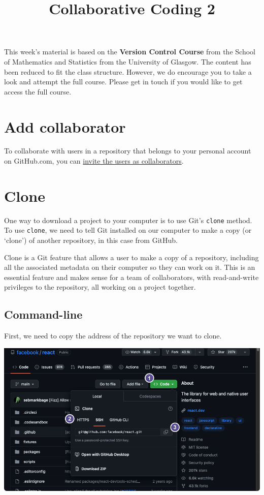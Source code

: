 \documentclass[
  letterpaper,
  DIV=11,
  numbers=noendperiod]{scrartcl}
\title{Collaborative Coding 2}
\author{}
\date{}
\makeatletter
\renewcommand{\maketitle}{\bgroup\setlength{\parindent}{0pt}
\begin{flushleft}
  {\color{uniblue}\sffamily\huge\textbf{\@title}} \vspace{0.3cm} \newline
  {\Large {\@subtitle}} \newline
  \@author
\end{flushleft}\egroup
}
\makeatother
\begin{document}
\maketitle

\pagestyle{mystyle}

This week's material is based on the \textbf{Version Control Course}
from the School of Mathematics and Statistics from the University of
Glasgow. The content has been reduced to fit the class structure.
However, we do encourage you to take a look and attempt the full course.
Please get in touch if you would like to get access the full course.

\section{Add collaborator}\label{add-collaborator}

To collaborate with users in a repository that belongs to your personal
account on GitHub.com, you can
\href{https://docs.github.com/en/account-and-profile/setting-up-and-managing-your-personal-account-on-github/managing-access-to-your-personal-repositories/inviting-collaborators-to-a-personal-repository}{invite
the users as collaborators}.

\section{Clone}\label{clone}

One way to download a project to your computer is to use Git's
\texttt{clone} method. To use \texttt{clone}, we need to tell Git
installed on our computer to make a copy (or `clone') of another
repository, in this case from GitHub.

Clone is a Git feature that allows a user to make a copy of a
repository, including all the associated metadata on their computer so
they can work on it. This is an essential feature and makes sense for a
team of collaborators, with read-and-write privileges to the repository,
all working on a project together.

\subsection{Command-line}

First, we need to copy the address of the repository we want to clone.

\includegraphics{images/image23.png}
\end{document}
